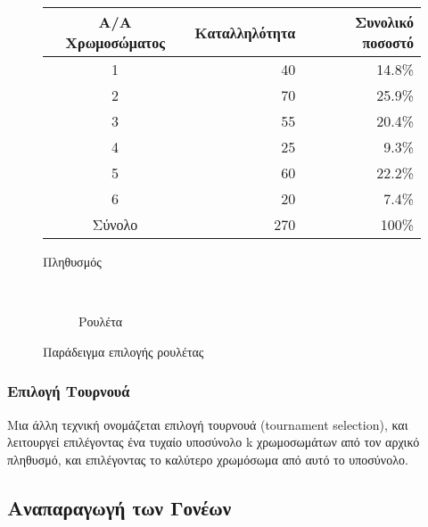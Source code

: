 \begin{figure*}[!t]
    \centering
    \begin{subtable}[t!]{.6\linewidth}
        \centering
        \begin{tabular}{@{}crr@{}}
            \toprule
            Α/Α Χρωμοσώματος & Καταλληλότητα & Συνολικό ποσοστό \\ \midrule
            1                & 40            & 14.8\%           \\
            2                & 70            & 25.9\%           \\
            3                & 55            & 20.4\%           \\
            4                & 25            & 9.3\%            \\
            5                & 60            & 22.2\%           \\
            6                & 20            & 7.4\%            \\ \midrule
            Σύνολο           & 270           & 100\%            \\ \bottomrule
        \end{tabular}
        \caption{Πληθυσμός}
    \end{subtable}
    ~
    \begin{subfigure}[t!]{.3\linewidth}
        \centering
        \caption{Ρουλέτα}
    \end{subfigure}

    \caption{Παράδειγμα επιλογής ρουλέτας}
    \label{fig_rouletteWheel}
\end{figure*}

\subsubsection{Επιλογή Τουρνουά}

Μια άλλη τεχνική ονομάζεται επιλογή τουρνουά (tournament selection), και λειτουργεί επιλέγοντας ένα τυχαίο υποσύνολο k χρωμοσωμάτων από τον αρχικό πληθυσμό, και επιλέγοντας το καλύτερο χρωμόσωμα από αυτό το υποσύνολο.

\subsection{Αναπαραγωγή των Γονέων}

